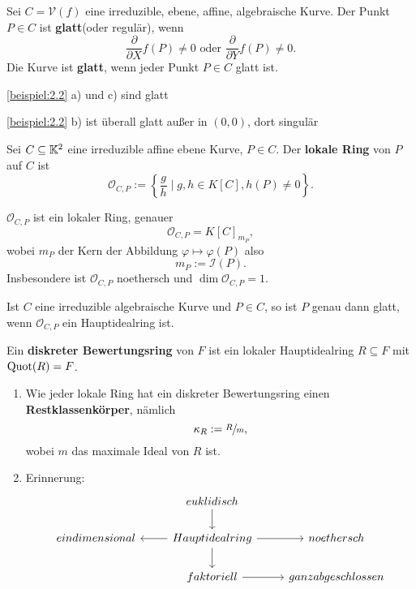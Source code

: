 \begin{definition}
    Sei $C = \mathcal{V}(f)$ eine irreduzible, ebene, affine, algebraische Kurve. Der Punkt $P \in C$ ist
    \textbf{glatt}(oder regulär), wenn
    $$ \frac{\partial}{\partial X}f(P) \neq 0 \text{ oder } \frac{\partial}{\partial Y} f(P) \neq 0.$$
    Die Kurve ist \textbf{glatt}, wenn jeder Punkt $P \in C$ glatt ist.
\end{definition}

\begin{beispiel}
    \cref{beispiel:2.2} a) und c) sind glatt

    \cref{beispiel:2.2} b) ist überall glatt außer in $(0,0)$, dort singulär
\end{beispiel}

\begin{definition}
    Sei $C\subseteq \mathbb{K}^2$ eine irreduzible affine ebene Kurve, $P \in C$. 
    Der \textbf{lokale Ring} von $P$ auf $C$ ist
    $$ \mathcal{O}_{C,P} := \left\{\frac{g}{h}\mid g,h\in K[C], h(P) \ne0\right\}.$$
\end{definition}

\begin{bemerkungnr}
    $\mathcal{O}_{C,P}$ ist ein lokaler Ring, genauer
    $$ \mathcal{O}_{C,P} = K[C]_{m_P},$$
    wobei $m_P$ der Kern der Abbildung $\varphi \mapsto \varphi(P)$ also
    $$ m_P := \mathcal{I}(P). $$
    Insbesondere ist $\mathcal{O}_{C,P}$ noethersch und $\dim \mathcal{O}_{C,P} = 1$.
\end{bemerkungnr}

\begin{satz}
    Ist $C$ eine irreduzible algebraische Kurve und $P \in C$, so ist $P$ genau dann glatt, wenn 
    $\mathcal{O}_{C,P}$ ein Hauptidealring ist.
\end{satz}

\begin{definition}
    Ein \textbf{diskreter Bewertungsring} von $F$ ist ein lokaler Hauptidealring $R \subseteq F$ mit $\operatorname{Quot}(R) = F$.
\end{definition}

\begin{bemerkungnr}
    \begin{enumerate}[label=\alph*)]
        \item Wie jeder lokale Ring hat ein diskreter Bewertungsring einen \textbf{Restklassenkörper}, nämlich
        $$ \kappa_R := \sfrac{R}{m}, $$
        wobei $m$ das maximale Ideal von $R$ ist.

        \item Erinnerung:
        $$\begin{tikzcd}
            & euklidisch \dar& \\
            eindimensional & \lar Hauptidealring \dar \rar & noethersch\\
            & faktoriell \rar & ganz abgeschlossen
        \end{tikzcd}$$
    \end{enumerate}
\end{bemerkungnr}

